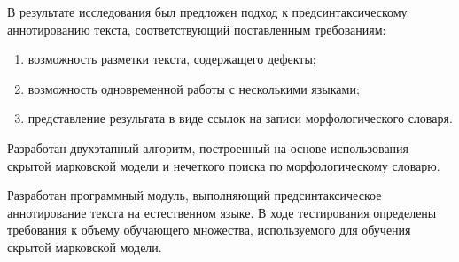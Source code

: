 В результате исследования был предложен подход к предсинтаксическому аннотированию текста, соответствующий поставленным требованиям:
\begin{enumerate}
	\item 
	возможность разметки текста, содержащего дефекты;
	\item
	возможность одновременной работы с несколькими языками;
	\item
	представление результата в виде ссылок на записи морфологического словаря.
\end{enumerate}

Разработан двухэтапный алгоритм, построенный на основе использования скрытой марковской модели и нечеткого поиска по морфологическому словарю.

Разработан программный модуль, выполняющий предсинтаксическое аннотирование текста на естественном языке. В ходе тестирования определены требования к объему обучающего множества, используемого для обучения скрытой марковской модели.